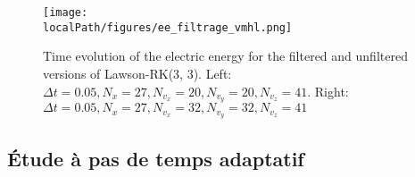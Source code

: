 \begin{figure}[h]
  \centering
  \texttt{[image: \\localPath/figures/ee\_filtrage\_vmhl.png]}
  \caption{Time evolution of the electric energy for the filtered and unfiltered versions of Lawson-RK(3, 3). Left: $\Delta t = 0.05, N_x=27, N_{v_x}=20, N_{v_y}=20, N_{v_z}=41$. Right: $\Delta t = 0.05, N_x=27, N_{v_x}=32, N_{v_y}=32, N_{v_z}=41$}
  \label{fig:compar_ee4d}
\end{figure}



\FloatBarrier
\subsection{Étude à pas de temps adaptatif}

